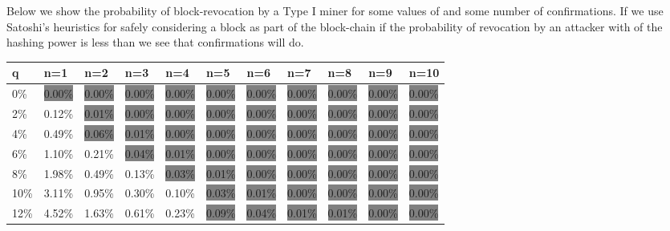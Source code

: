 \documentclass[letterpaper,12pt]{report}
\begin{document}
Below we show the probability of block-revocation by a Type I miner for some values of  and some number of confirmations. If we use Satoshi's heuristics for safely considering a block as part of the block-chain if the probability of revocation by an attacker with  of the hashing power is less than  we see that  confirmations will do. 

\begin{table}
\resizebox{18cm}{!} {
    \begin{tabular}{l|llllllllll}
    q  & n=1     & n=2     & n=3     & n=4     & n=5     & n=6     & n=7     & n=8     & n=9     & n=10    \\ \hline
    0\% & \colorbox{gray}{0.00\%}  & \colorbox{gray}{0.00\%}  & \colorbox{gray}{0.00\%}  & \colorbox{gray}{0.00\%}  & \colorbox{gray}{0.00\%}  & \colorbox{gray}{0.00\%}  & \colorbox{gray}{0.00\%}  & \colorbox{gray}{0.00\%}  & \colorbox{gray}{0.00\%}  & \colorbox{gray}{0.00\%}  \\
    2\% & 0.12\%  & \colorbox{gray}{0.01\%}  & \colorbox{gray}{0.00\%}  & \colorbox{gray}{0.00\%}  & \colorbox{gray}{0.00\%}  & \colorbox{gray}{0.00\%}  & \colorbox{gray}{0.00\%}  & \colorbox{gray}{0.00\%}  & \colorbox{gray}{0.00\%}  & \colorbox{gray}{0.00\%}  \\
    4\% & 0.49\%  & \colorbox{gray}{0.06\%}  & \colorbox{gray}{0.01\%}  & \colorbox{gray}{0.00\%}  & \colorbox{gray}{0.00\%}  & \colorbox{gray}{0.00\%}  & \colorbox{gray}{0.00\%}  & \colorbox{gray}{0.00\%}  & \colorbox{gray}{0.00\%}  & \colorbox{gray}{0.00\%}  \\
    6\% & 1.10\%  & 0.21\%  & \colorbox{gray}{0.04\%}  & \colorbox{gray}{0.01\%}  & \colorbox{gray}{0.00\%}  & \colorbox{gray}{0.00\%}  & \colorbox{gray}{0.00\%}  & \colorbox{gray}{0.00\%}  & \colorbox{gray}{0.00\%}  & \colorbox{gray}{0.00\%}  \\
    8\% & 1.98\%  & 0.49\%  & 0.13\%  & \colorbox{gray}{0.03\%}  & \colorbox{gray}{0.01\%}  & \colorbox{gray}{0.00\%}  & \colorbox{gray}{0.00\%}  & \colorbox{gray}{0.00\%}  & \colorbox{gray}{0.00\%}  & \colorbox{gray}{0.00\%}  \\
    10\% & 3.11\%  & 0.95\%  & 0.30\%  & 0.10\%  & \colorbox{gray}{0.03\%}  & \colorbox{gray}{0.01\%}  & \colorbox{gray}{0.00\%}  & \colorbox{gray}{0.00\%}  & \colorbox{gray}{0.00\%}  & \colorbox{gray}{0.00\%}  \\
    12\% & 4.52\%  & 1.63\%  & 0.61\%  & 0.23\%  & \colorbox{gray}{0.09\%}  & \colorbox{gray}{0.04\%}  & \colorbox{gray}{0.01\%}  & \colorbox{gray}{0.01\%}  & \colorbox{gray}{0.00\%}  & \colorbox{gray}{0.00\%}  \\

\end{tabular}}
\end{table}
\end{document}
